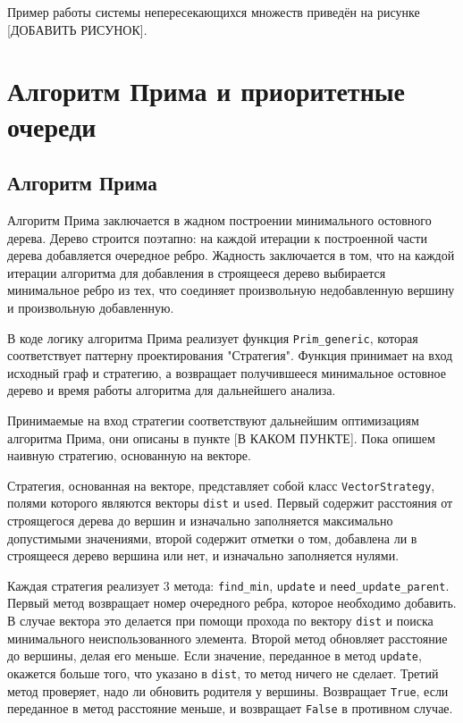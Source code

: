 	Пример работы системы непересекающихся множеств приведён на рисунке [ДОБАВИТЬ РИСУНОК].
	
	\section{Алгоритм Прима и приоритетные очереди}
	
	\subsection{Алгоритм Прима}
	
	\hspace{0.5 cm}
	
	Алгоритм Прима заключается в жадном построении минимального остовного дерева. Дерево строится поэтапно: на каждой итерации к построенной части дерева добавляется очередное ребро. Жадность заключается в том, что на каждой итерации алгоритма для добавления в строящееся дерево выбирается минимальное ребро из тех, что соединяет произвольную недобавленную вершину и произвольную добавленную.
	
	В коде логику алгоритма Прима реализует функция \texttt{Prim\_generic}, которая соответствует паттерну проектирования "Стратегия". Функция принимает на вход исходный граф и стратегию, а возвращает получившееся минимальное остовное дерево и время работы алгоритма для дальнейшего анализа. 
	
	Принимаемые на вход стратегии соответствуют дальнейшим оптимизациям алгоритма Прима, они описаны в пункте [В КАКОМ ПУНКТЕ]. Пока опишем наивную стратегию, основанную на векторе.
	
	Стратегия, основанная на векторе, представляет собой класс \texttt{VectorStrategy}, полями которого являются векторы \texttt{dist} и \texttt{used}. Первый содержит расстояния от строящегося дерева до вершин и изначально заполняется максимально допустимыми значениями, второй содержит отметки о том, добавлена ли в строящееся дерево вершина или нет, и изначально заполняется нулями.
	
	Каждая стратегия реализует 3 метода: \texttt{find\_min}, \texttt{update} и \texttt{need\_update\_parent}. Первый метод возвращает номер очередного ребра, которое необходимо добавить. В случае вектора это делается при помощи прохода по вектору \texttt{dist} и поиска минимального неиспользованного элемента. Второй метод обновляет расстояние до вершины, делая его меньше. Если значение, переданное в метод \texttt{update}, окажется больше того, что указано в \texttt{dist}, то метод ничего не сделает. Третий метод проверяет, надо ли обновить родителя у вершины. Возвращает \texttt{True}, если переданное в метод расстояние меньше, и возвращает \texttt{False} в противном случае.
	
